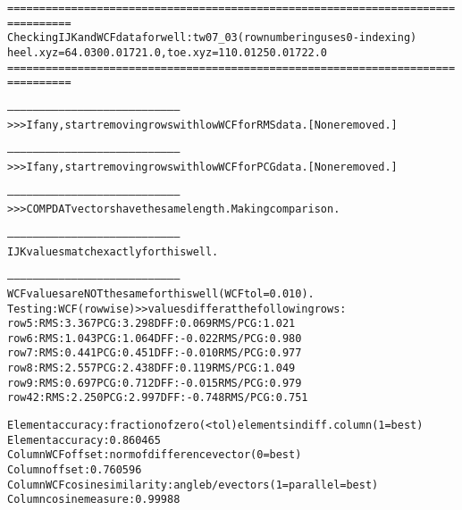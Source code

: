 \begin{alltt}
================================================================================
Checking IJK and WCF data for well: tw07_03 (row numbering uses 0-indexing)
heel.xyz = 64.0 300.0 1721.0, toe.xyz = 110.0 1250.0 1722.0
================================================================================

--------------------------------------------------------------------------------
>>> If any, start removing rows with low WCF for RMS data. [None removed.]

--------------------------------------------------------------------------------
>>> If any, start removing rows with low WCF for PCG data. [None removed.]

--------------------------------------------------------------------------------
>>> COMPDAT vectors have the same length. Making comparison.

--------------------------------------------------------------------------------
IJK values match exactly for this well.

--------------------------------------------------------------------------------
WCF values are NOT the same for this well (WCF tol = 0.010).
Testing: WCF (rowwise) >> values differ at the following rows:
row   5:  RMS:   3.367    PCG:   3.298    DFF:   0.069    RMS/PCG:   1.021    
row   6:  RMS:   1.043    PCG:   1.064    DFF:  -0.022    RMS/PCG:   0.980    
row   7:  RMS:   0.441    PCG:   0.451    DFF:  -0.010    RMS/PCG:   0.977    
row   8:  RMS:   2.557    PCG:   2.438    DFF:   0.119    RMS/PCG:   1.049    
row   9:  RMS:   0.697    PCG:   0.712    DFF:  -0.015    RMS/PCG:   0.979    
row  42:  RMS:   2.250    PCG:   2.997    DFF:  -0.748    RMS/PCG:   0.751    

Element accuracy: fraction of zero (<tol) elements in diff. column (1=best)
Element accuracy:  0.860465
Column WCF offset: norm of difference vector (0=best)
Column offset:  0.760596
Column WCF cosine similarity: angle b/e vectors (1=parallel=best)
Column cosine measure:  0.99988
\end{alltt}
